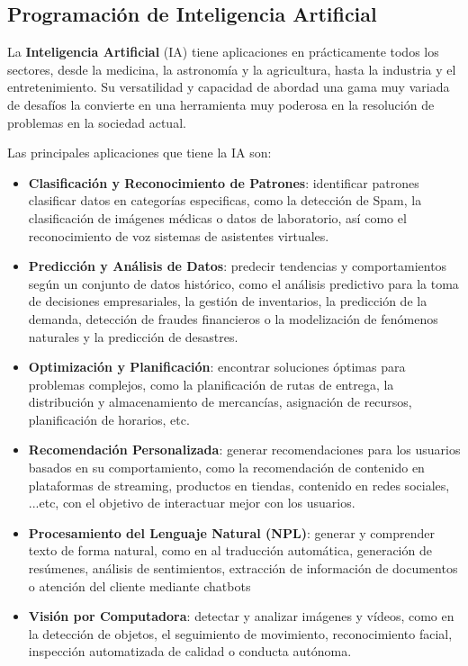 \subsection{Programación de Inteligencia Artificial}
La \textbf{Inteligencia Artificial} (IA) tiene aplicaciones en prácticamente todos los sectores, desde la medicina, la astronomía y la agricultura, hasta la industria y el entretenimiento. Su versatilidad y capacidad de abordad una gama muy variada de desafíos la convierte en una herramienta muy poderosa en la resolución de problemas en la sociedad actual. 

Las principales aplicaciones que tiene la IA son:

\begin{itemize}
	\item \textbf{Clasificación y Reconocimiento de Patrones}: identificar patrones clasificar datos en categorías especificas, como la detección de Spam, la clasificación de imágenes médicas o datos de laboratorio, así como el reconocimiento de voz sistemas de asistentes virtuales.
	\item \textbf{Predicción y Análisis de Datos}: predecir tendencias y comportamientos según un conjunto de datos histórico, como el análisis predictivo para la toma de decisiones empresariales, la gestión de inventarios, la predicción de la demanda, detección de fraudes financieros o la modelización de fenómenos naturales y la predicción de desastres.
	\item \textbf{Optimización y Planificación}: encontrar soluciones óptimas para problemas complejos, como la planificación de rutas de entrega, la distribución y almacenamiento de mercancías, asignación de recursos, planificación de horarios, etc.
	\item \textbf{Recomendación Personalizada}: generar recomendaciones para los usuarios basados en su comportamiento, como la recomendación de contenido en plataformas de streaming, productos en tiendas, contenido en redes sociales, ...etc, con el objetivo de interactuar mejor con los usuarios.
	\item \textbf{Procesamiento del Lenguaje Natural (NPL)}: generar y comprender texto de forma natural, como en al traducción automática, generación de resúmenes, análisis de sentimientos, extracción de información de documentos o atención del cliente mediante \gls{chatbots}
	\item \textbf{Visión por Computadora}: detectar y analizar imágenes y vídeos, como en la detección de objetos, el seguimiento de movimiento, reconocimiento facial, inspección automatizada de calidad o conducta autónoma.

\end{itemize}
